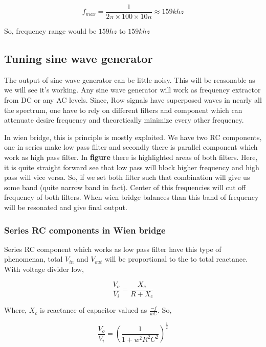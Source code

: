 \documentclass[14pt,a4paper]{extarticle}
\begin{document}
\begin{equation*}
\label{eq:org998ea2c}
  f_{max} = \frac{1}{2\pi\times100\times 10n} \approx 159k hz
\end{equation*}

So, frequency range would be \(159 hz\) to \(159k hz\)

\subsection{Tuning sine wave generator}
\label{sec:org8f71875}

The output of sine wave generator can be little noisy. This will be reasonable as we will see it's working. Any sine wave generator will work as frequency extractor from DC or any AC levels. Since, Row signals have superposed waves in nearly all the spectrum, one have to rely on different filters and component which can attenuate desire frequency and theoretically minimize every other frequency. 


In wien bridge, this is principle is mostly exploited. We have two RC components, one in series make low pass filter and secondly there is parallel component which work as high pass filter. In \textbf{\textbf{figure}} there is highlighted areas of both filters. Here, it is quite straight forward see that low pass will block higher frequency and high pass will vice versa. So, if we set both filter such that combination will give us some band (quite narrow band in fact). Center of this frequencies will cut off frequency of both filters. When wien bridge balances than this band of frequency will be resonated and give final output.

\subsubsection{Series RC components in Wien bridge}
\label{sec:org9053ffe}
Series RC component which works as low pass filter have this type of phenomenan, total \(V_{in}\) and \(V_{out}\) will be proportional to the to total reactance. With voltage divider low, 


\begin{equation*}
\frac{V_o}{V_i}= \frac{X_c}{R+X_c}
\end{equation*}

Where, \(X_c\) is reactance of capacitor valued as \(\frac{-j}{wC}\). So,

\begin{equation*}
\frac{V_o}{V_i}=\left(\frac{1}{1+w^2R^2C^2}\right)^{\frac{1}{2}}
\end{equation*}
\end{document}
